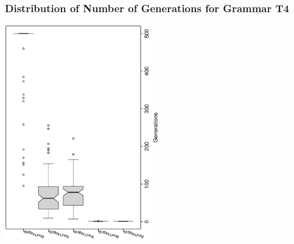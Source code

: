  \begin{frame}
 \frametitle{ Distribution of Number of Generations for Grammar T4 }
 \begin{center}
\includegraphics[width=0.5\textwidth, angle=-90]
{ExpEboxplottGenerations005.eps}
 \end{center}
 \label{ExpEboxplottGenerations005.eps}  
 \end{frame}

